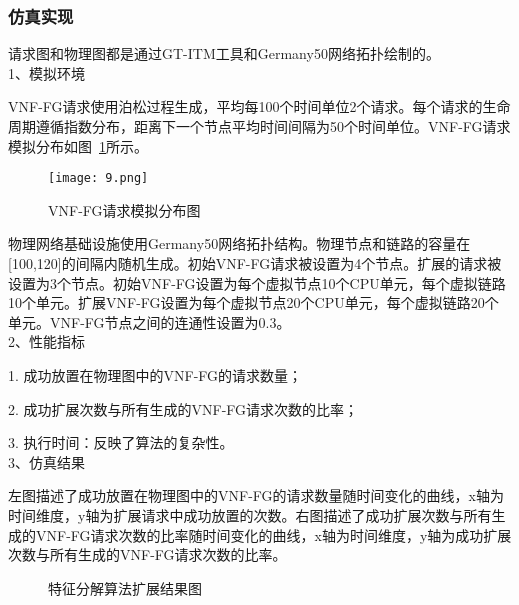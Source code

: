 \subsubsection{仿真实现}
请求图和物理图都是通过GT-ITM工具和Germany50网络拓扑绘制的。\\
1、模拟环境\par
VNF-FG请求使用泊松过程生成，平均每100个时间单位2个请求。每个请求的生命周期遵循指数分布，距离下一个节点平均时间间隔为50个时间单位。VNF-FG请求模拟分布如图~\ref{figure:9}所示。
\begin{figure}[H]
    \centering
    \texttt{[image: 9.png]}
    \caption{VNF-FG请求模拟分布图}
    \label{figure:9}
\end{figure}
物理网络基础设施使用Germany50网络拓扑结构。物理节点和链路的容量在[100,120]的间隔内随机生成。初始VNF-FG请求被设置为4个节点。扩展的请求被设置为3个节点。初始VNF-FG设置为每个虚拟节点10个CPU单元，每个虚拟链路10个单元。扩展VNF-FG设置为每个虚拟节点20个CPU单元，每个虚拟链路20个单元。VNF-FG节点之间的连通性设置为0.3。\\
2、性能指标\par
  1. 成功放置在物理图中的VNF-FG的请求数量；\par
  2. 成功扩展次数与所有生成的VNF-FG请求次数的比率；\par
  3. 执行时间：反映了算法的复杂性。\\
3、仿真结果\par
左图描述了成功放置在物理图中的VNF-FG的请求数量随时间变化的曲线，x轴为时间维度，y轴为扩展请求中成功放置的次数。右图描述了成功扩展次数与所有生成的VNF-FG请求次数的比率随时间变化的曲线，x轴为时间维度，y轴为成功扩展次数与所有生成的VNF-FG请求次数的比率。\\
\begin{figure}[H]
    \centering    %
    \caption{特征分解算法扩展结果图} %
    \label{fig:1}  %
\end{figure}



